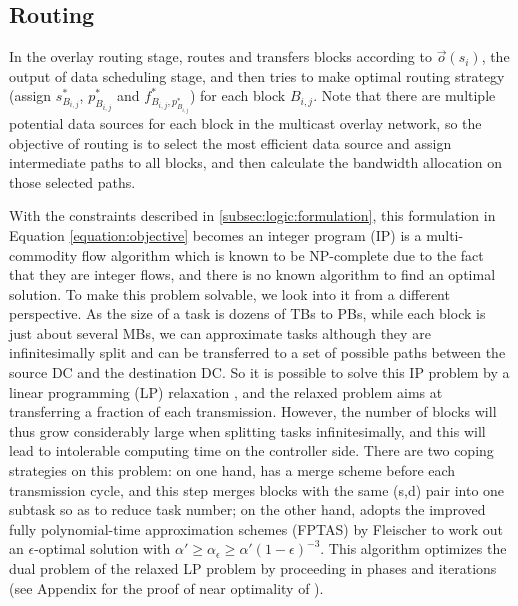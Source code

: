 \subsection{Routing}
\label{subsec:logic:routing}

In the overlay routing stage, \name routes and transfers blocks according to $\overrightarrow{o}(s_i)$, the output of data scheduling stage, and then tries to make optimal routing strategy (assign $s_{B_{i,j}}^*$, $p_{B_{i,j}}^*$ and $f^*_{B_{i,j},p_{B_{i,j}}^*}$) for each block $B_{i,j}$. Note that there are multiple potential data sources for each block in the multicast overlay network, so the objective of routing is to select the most efficient data source and assign intermediate paths to all blocks, and then calculate the bandwidth allocation on those selected paths.

With the constraints described in \Section\ref{subsec:logic:formulation}, this formulation in Equation \ref{equation:objective} becomes an integer program (IP) is a multi-commodity flow algorithm which is known to be NP-complete \cite{garg1997primal} due to the fact that they are integer flows, and there is no known algorithm to find an optimal solution. To make this problem solvable, we look into it from a different perspective. As the size of a task is dozens of TBs to PBs, while each block is just about several MBs, we can approximate tasks although they are infinitesimally split and can be transferred to a set of possible paths between the source DC and the destination DC. So it is possible to solve this IP problem by a linear programming (LP) relaxation \cite{garg2007faster,reed2012traffic}, and the relaxed problem aims at transferring a fraction of each transmission. However, the number of blocks will thus grow considerably large when splitting tasks infinitesimally, and this will lead to intolerable computing time on the controller side. There are two coping strategies on this problem: on one hand, \name has a merge scheme before each transmission cycle, and this step merges blocks with the same (s,d) pair into one subtask so as to reduce task number; on the other hand, \name adopts the improved fully polynomial-time approximation schemes (FPTAS) by Fleischer \cite{fleischer2000approximating} to work out an $\epsilon$-optimal solution with $\alpha' \geq \alpha_\epsilon \geq \alpha'(1-\epsilon)^{-3}$. This algorithm optimizes the dual problem of the relaxed LP problem by proceeding in phases and iterations (see Appendix for the proof of near optimality of \name).

